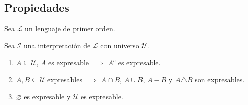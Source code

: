     \subsection{Propiedades}

    Sea $\mathcal{L}$ un lenguaje de primer orden. 

    Sea $\mathcal{I}$ una interpretación de $\mathcal{L}$ con universo
    $\mathcal{U}$.

    \begin{enumerate}
        \item $A \subseteq \mathcal{U}$, $A$ es expresable $\implies$ $A^c$ es
            expresable.
        \item $A, B \subseteq \mathcal{U}$ expresables $\implies$ $A \cap B$,
            $A \cup B$, $A - B$ y $A \triangle B$ son expresables.
        \item $\varnothing$ es expresable y $\mathcal{U}$ es expresable.
    \end{enumerate}

